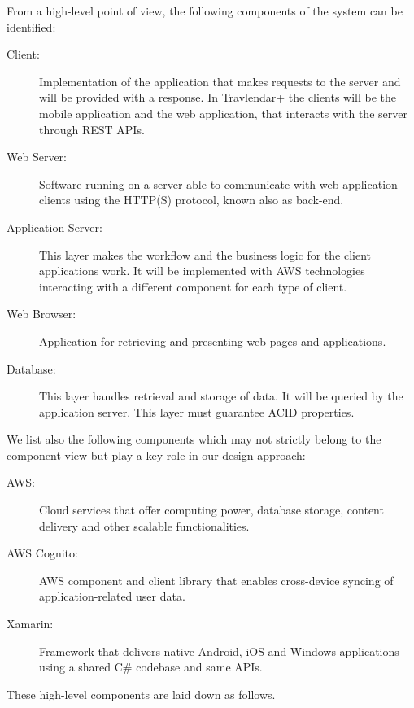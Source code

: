 From a high-level point of view, the following components of the system can be identified:
\begin{description}
	\item[Client:] Implementation of the application that makes requests to the server and will be provided with a response. In Travlendar+ the clients will be the mobile application and the web application, that interacts with the server through REST APIs.
	\item[Web Server:] Software running on a server able to communicate with web application clients using the HTTP(S) protocol, known also as back-end.
	
	\item[Application Server:] This layer makes the workflow and the business logic for the client applications work. It will be implemented with AWS technologies interacting with a different component for each type of client.
	\item[Web Browser:] Application for retrieving and presenting web pages and applications.
	\item[Database:] This layer handles retrieval and storage of data. It will be queried by the application server. This layer must guarantee ACID properties.
\end{description}

We list also the following components which may not strictly belong to the component view but play a key role in our design approach:
\begin{description}
	\item[AWS:] Cloud services that offer computing power, database storage, content delivery and other scalable functionalities.
	\item [AWS Cognito:] AWS component and client library that enables cross-device syncing of application-related user data.
	\item[Xamarin:] Framework that delivers native Android, iOS and Windows applications using a shared C\# codebase and same APIs.
\end{description}

These high-level components are laid down as follows.

